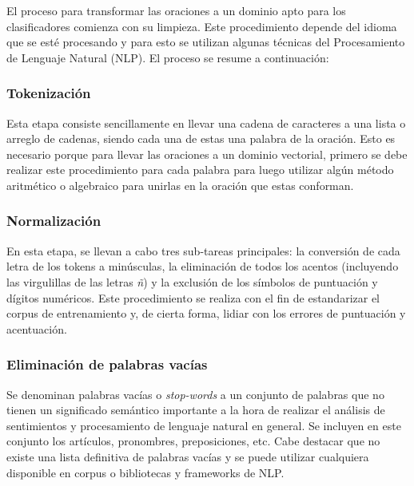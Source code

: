 \documentclass[conference]{IEEEtran}
\begin{document}
    	El proceso para transformar las oraciones a un dominio apto para los clasificadores comienza con su limpieza. Este procedimiento depende del idioma que se esté procesando y para esto se utilizan algunas técnicas del Procesamiento de Lenguaje Natural (NLP). El proceso se resume a continuación:
    	\newline
    	
    	\subsubsection{Tokenización}
    	
    		Esta etapa consiste sencillamente en llevar una cadena de caracteres a una lista o arreglo de cadenas, siendo cada una de estas una palabra de la oración. Esto es necesario porque para llevar las oraciones a un dominio vectorial, primero se debe realizar este procedimiento para cada palabra para luego utilizar algún método aritmético o algebraico para unirlas en la oración que estas conforman.
    		\newline
    	
    	\subsubsection{Normalización}
    	
    		En esta etapa, se llevan a cabo tres sub-tareas principales: la conversión de cada letra de los tokens a minúsculas, la eliminación de todos los acentos (incluyendo las virgulillas de las letras \textit{ñ}) y la exclusión de los símbolos de puntuación y dígitos numéricos. Este procedimiento se realiza con el fin de estandarizar el corpus de entrenamiento y, de cierta forma, lidiar con los errores de puntuación y acentuación.
    		\newline	
    	
    	\subsubsection{Eliminación de palabras vacías}
    	
    		Se denominan palabras vacías o \textit{stop-words} a un conjunto de palabras que no tienen un significado semántico importante a la hora de realizar el análisis de sentimientos y procesamiento de lenguaje natural en general. Se incluyen en este conjunto los artículos, pronombres, preposiciones, etc. Cabe destacar que no existe una lista definitiva de palabras vacías y se puede utilizar cualquiera disponible en corpus o bibliotecas y frameworks de NLP.
    		\newline
    	
\end{document}
